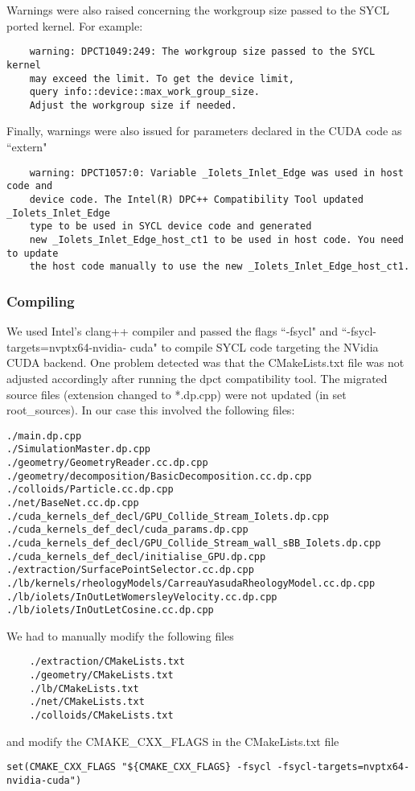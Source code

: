 \documentclass[../main]{subfiles}
\begin{document}
Warnings were also raised concerning the workgroup size passed to the SYCL ported kernel. For example:
\begin{verbatim}
    warning: DPCT1049:249: The workgroup size passed to the SYCL kernel 
    may exceed the limit. To get the device limit, 
    query info::device::max_work_group_size. 
    Adjust the workgroup size if needed.
\end{verbatim}

Finally, warnings were also issued for parameters declared in the CUDA code as ``extern"
\begin{verbatim}
    warning: DPCT1057:0: Variable _Iolets_Inlet_Edge was used in host code and 
    device code. The Intel(R) DPC++ Compatibility Tool updated _Iolets_Inlet_Edge 
    type to be used in SYCL device code and generated 
    new _Iolets_Inlet_Edge_host_ct1 to be used in host code. You need to update 
    the host code manually to use the new _Iolets_Inlet_Edge_host_ct1.
\end{verbatim}

\subsubsection{Compiling}
We used Intel’s clang++ compiler and passed the flags ``-fsycl" and ``-fsycl-targets=nvptx64-nvidia-
cuda" to compile SYCL code targeting the NVidia CUDA backend. 
One problem detected was that the CMakeLists.txt file was not adjusted accordingly after running the dpct compatibility tool. The migrated source files (extension changed to *.dp.cpp) were not updated (in set root\_sources). In our case this involved the following files:
\begin{verbatim}
./main.dp.cpp
./SimulationMaster.dp.cpp
./geometry/GeometryReader.cc.dp.cpp
./geometry/decomposition/BasicDecomposition.cc.dp.cpp
./colloids/Particle.cc.dp.cpp
./net/BaseNet.cc.dp.cpp
./cuda_kernels_def_decl/GPU_Collide_Stream_Iolets.dp.cpp
./cuda_kernels_def_decl/cuda_params.dp.cpp
./cuda_kernels_def_decl/GPU_Collide_Stream_wall_sBB_Iolets.dp.cpp
./cuda_kernels_def_decl/initialise_GPU.dp.cpp
./extraction/SurfacePointSelector.cc.dp.cpp
./lb/kernels/rheologyModels/CarreauYasudaRheologyModel.cc.dp.cpp
./lb/iolets/InOutLetWomersleyVelocity.cc.dp.cpp
./lb/iolets/InOutLetCosine.cc.dp.cpp
\end{verbatim}

We had to manually modify the following files
\begin{verbatim}
    ./extraction/CMakeLists.txt
    ./geometry/CMakeLists.txt
    ./lb/CMakeLists.txt
    ./net/CMakeLists.txt
    ./colloids/CMakeLists.txt
\end{verbatim}
and modify the CMAKE\_CXX\_FLAGS in the CMakeLists.txt file
\begin{verbatim}
set(CMAKE_CXX_FLAGS "${CMAKE_CXX_FLAGS} -fsycl -fsycl-targets=nvptx64-nvidia-cuda")
\end{verbatim}
\end{document}
